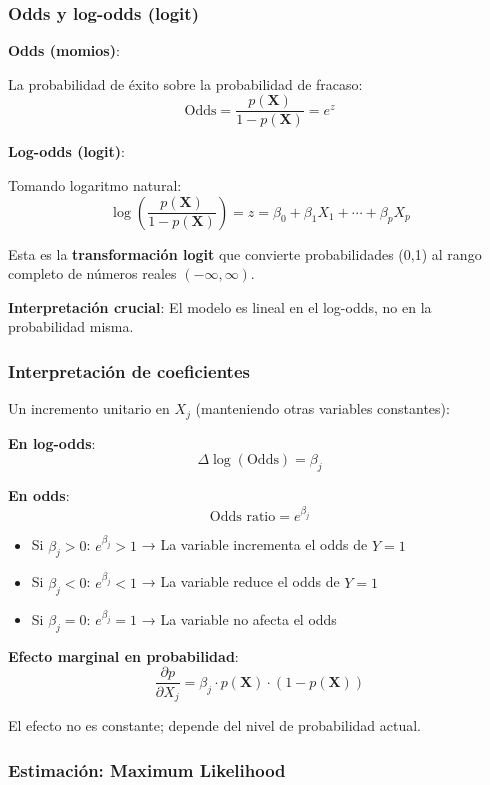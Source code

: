\documentclass[
  doc,
  floatsintext,
  longtable,
  a4paper,
  nolmodern,
  notxfonts,
  notimes,
  12pt,
  colorlinks=true,linkcolor=blue,citecolor=blue,urlcolor=blue]{apa7}
\providecommand{\tightlist}{%
  \setlength{\itemsep}{0pt}\setlength{\parskip}{0pt}}
\begin{document}
\subsubsection{Odds y log-odds (logit)}\label{odds-y-log-odds-logit}

\textbf{Odds (momios)}:

La probabilidad de éxito sobre la probabilidad de fracaso: \[
\text{Odds} = \frac{p(\mathbf{X})}{1 - p(\mathbf{X})} = e^z
\]

\textbf{Log-odds (logit)}:

Tomando logaritmo natural: \[
\log\left(\frac{p(\mathbf{X})}{1-p(\mathbf{X})}\right) = z = \beta_0 + \beta_1 X_1 + \cdots + \beta_p X_p
\]

Esta es la \textbf{transformación logit} que convierte probabilidades
(0,1) al rango completo de números reales \((-\infty, \infty)\).

\textbf{Interpretación crucial}: El modelo es lineal en el log-odds, no
en la probabilidad misma.

\subsubsection{Interpretación de
coeficientes}\label{interpretaciuxf3n-de-coeficientes}

Un incremento unitario en \(X_j\) (manteniendo otras variables
constantes):

\textbf{En log-odds}: \[
\Delta \log(\text{Odds}) = \beta_j
\]

\textbf{En odds}: \[
\text{Odds ratio} = e^{\beta_j}
\]

\begin{itemize}
\tightlist
\item
  Si \(\beta_j > 0\): \(e^{\beta_j} > 1\) → La variable incrementa el
  odds de \(Y=1\)
\item
  Si \(\beta_j < 0\): \(e^{\beta_j} < 1\) → La variable reduce el odds
  de \(Y=1\)
\item
  Si \(\beta_j = 0\): \(e^{\beta_j} = 1\) → La variable no afecta el
  odds
\end{itemize}

\textbf{Efecto marginal en probabilidad}: \[
\frac{\partial p}{\partial X_j} = \beta_j \cdot p(\mathbf{X}) \cdot (1 - p(\mathbf{X}))
\]

El efecto no es constante; depende del nivel de probabilidad actual.

\subsubsection{Estimación: Maximum
Likelihood}\label{estimaciuxf3n-maximum-likelihood}
\end{document}
